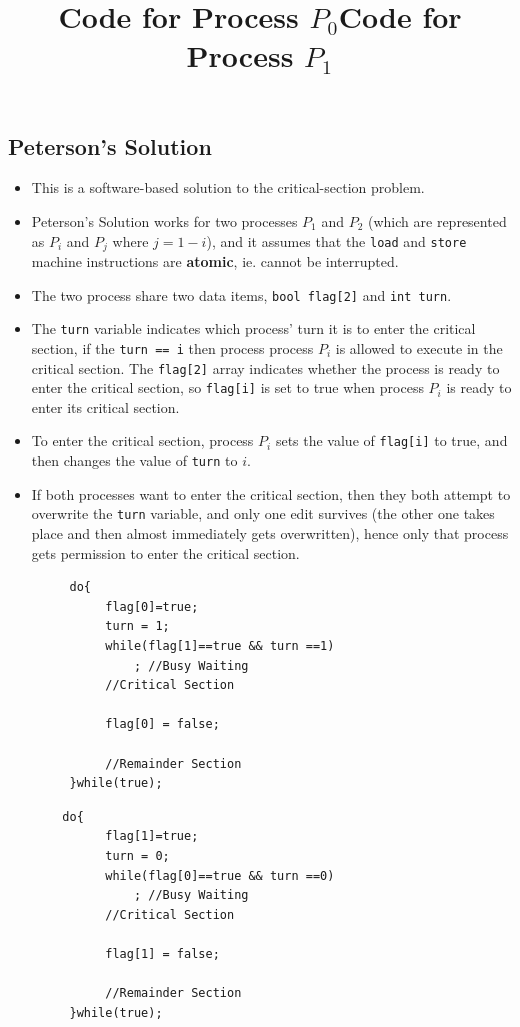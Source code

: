 \documentclass{article}
\theoremstyle{plain}
\theoremstyle{definition}
\begin{document}
\subsection{Peterson's Solution}
\begin{itemize}
    \item This is a software-based solution to the critical-section problem.
    
    \item Peterson's Solution works for two processes $P_1$ and $P_2$ (which are represented as $P_i$ and $P_j$ where $j = 1-i$), and it assumes that the \texttt{load} and \texttt{store} machine instructions are \textbf{atomic}, ie. cannot be interrupted.
    
    \item The two process share two data items, \texttt{bool flag[2]} and \texttt{int turn}.
    
    \item The \texttt{turn} variable indicates which process' turn it is to enter the critical section, if the \texttt{turn == i} then process process $P_i$ is allowed to execute in the critical section. The \texttt{flag[2]} array indicates whether the process is ready to enter the critical section, so \texttt{flag[i]} is set to true when process $P_i$ is ready to enter its critical section. 
    
    \item To enter the critical section, process $P_i$ sets the value of \texttt{flag[i]} to true, and then changes the value of \texttt{turn} to $i$.
    
    \item If both processes want to enter the critical section, then they both attempt to overwrite the \texttt{turn} variable, and only one edit survives (the other one takes place and then almost immediately gets overwritten), hence only that process gets permission to enter the critical section.
\end{itemize}
\begin{figure}[!ht]
 \begin{minipage}{0.5\textwidth}
  \centering
  \begin{verbatim}
   do{
        flag[0]=true;
        turn = 1;
        while(flag[1]==true && turn ==1)
            ; //Busy Waiting
        //Critical Section
        
        flag[0] = false;
        
        //Remainder Section
   }while(true);
  \end{verbatim}
  \title{Code for Process $P_0$}
 \end{minipage}
 \begin{minipage}{0.5\textwidth}
  \centering
  \begin{verbatim}
  do{
        flag[1]=true;
        turn = 0;
        while(flag[0]==true && turn ==0)
            ; //Busy Waiting
        //Critical Section
        
        flag[1] = false;
        
        //Remainder Section
   }while(true);
  \end{verbatim}
  \title{Code for Process $P_1$}
 \end{minipage}
\end{figure}
\end{document}
